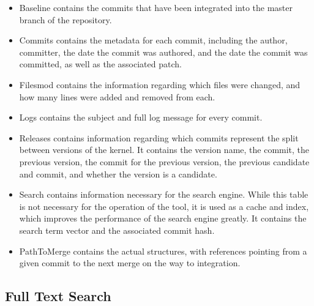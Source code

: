 \begin{itemize}
  \item

    Baseline contains the commits that have been integrated into the
    master branch of the repository.

  \item

    Commits contains the metadata for each commit, including the author,
    committer, the date the commit was authored, and the date the commit
    was committed, as well as the associated patch.

  \item

    Filesmod contains the information regarding which files were changed,
    and how many lines were added and removed from each.

  \item

    Logs contains the subject and full log message for every commit.

  \item

    Releases contains information regarding which commits represent the
    split between versions of the kernel. It contains the version name,
    the commit, the previous version, the commit for the previous
    version, the previous candidate and commit, and whether the version
    is a candidate.

  \item

    Search contains information necessary for the search engine. While
    this table is not necessary for the operation of the tool, it is
    used as a cache and index, which improves the performance of the
    search engine greatly. It contains the search term vector and the
    associated commit hash.

  \item

    PathToMerge contains the actual \mt{} structures, with
    references pointing from a given commit to the next merge on the way
    to integration.

\end{itemize}


\subsection{Full Text Search}\label{sub:full_text_search}


